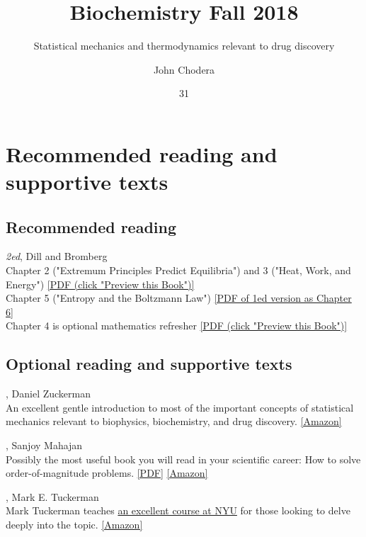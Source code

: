 \documentclass[english,course]{lecture}
\title{Biochemistry Fall 2018}
\subtitle{Statistical mechanics and thermodynamics relevant to drug discovery}
\author{John Chodera}
\date{31}{08}{2018}
\begin{document}
\vfill
\eject


\section{Recommended reading and supportive texts}

\subsection*{Recommended reading}

 \emph{2ed}, Dill and Bromberg\\
Chapter 2 ("Extremum Principles Predict Equilibria") and 3 ("Heat, Work, and Energy") \href{https://tinyurl.com/dill-bromberg-preview}{[PDF (click "Preview this Book")]}\\
Chapter 5 ("Entropy and the Boltzmann Law") \href{https://tinyurl.com/dill-bromberg-boltzmann}{[PDF of 1ed version as Chapter 6]}\\
Chapter 4 is optional mathematics refresher \href{https://tinyurl.com/dill-bromberg-preview}{[PDF (click "Preview this Book")]}

\subsection*{Optional reading and supportive texts}

, Daniel Zuckerman \\
An excellent gentle introduction to most of the important concepts of statistical mechanics relevant to biophysics, biochemistry, and drug discovery. 
\href{https://www.amazon.com/dp/B005H6YEBI}{[Amazon]} 

, Sanjoy Mahajan \\
Possibly the most useful book you will read in your scientific career: How to solve order-of-magnitude problems.
\href{https://tinyurl.com/street-fighting-mathematics}{[PDF]}
\href{https://www.amazon.com/exec/obidos/ASIN/026251429X}{[Amazon]}

, Mark E. Tuckerman \\
Mark Tuckerman teaches \href{http://www.nyu.edu/classes/tuckerman/stat.mech/}{an excellent course at NYU} for those looking to delve deeply into the topic.
\href{https://www.amazon.com/Statistical-Mechanics-Molecular-Simulation-Graduate/dp/0198525265}{[Amazon]}
\end{document}
